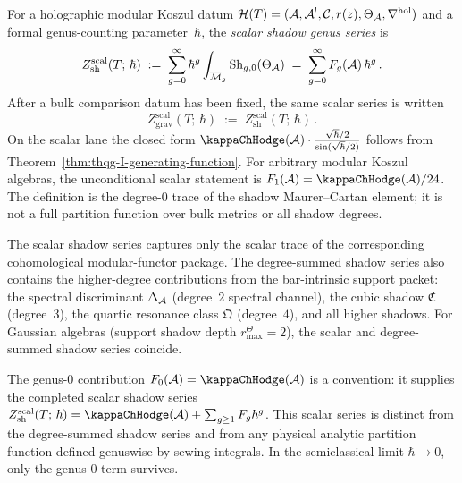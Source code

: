 \begin{definition}
For a holographic modular Koszul datum
$\mathcal{H}(T) = (\mathcal{A}, \mathcal{A}^!, \mathcal{C}, r(z), \Theta_{\mathcal{A}},
\nabla^{\mathrm{hol}})$ and a formal genus-counting
parameter~$\hbar$, the \emph{scalar shadow genus series} is
\begin{equation}%
Z_{\mathrm{sh}}^{\mathrm{scal}}(T;\,\hbar)
\;:=\;
\sum_{g=0}^{\infty} \hbar^g
\int_{\overline{\mathcal{M}}_{g}}
\operatorname{Sh}_{g,0}(\Theta_\cA)
\;=\;
\sum_{g=0}^{\infty} F_g(\cA)\,\hbar^g\,.
\end{equation}
After a bulk comparison datum has been fixed, the same scalar series is
written
\begin{equation}%
Z_{\mathrm{grav}}^{\mathrm{scal}}(T;\,\hbar)
\;:=\;
Z_{\mathrm{sh}}^{\mathrm{scal}}(T;\,\hbar)\,.
\end{equation}
On the scalar lane the closed form
$\kappaChHodge(\cA) \cdot \frac{\sqrt{\hbar}/2}{\sin(\sqrt{\hbar}/2)}$
follows from Theorem~\ref{thm:thqg-I-generating-function}. For
arbitrary modular Koszul algebras, the unconditional scalar statement
is $F_1(\cA)=\kappaChHodge(\cA)/24$. The definition is the
degree-$0$ trace of the shadow Maurer--Cartan element; it is not a full
partition function over bulk metrics or all shadow degrees.
\end{definition}

\begin{remark}
The scalar shadow series captures only the scalar trace of the
corresponding cohomological modular-functor package. The degree-summed
shadow series also contains the higher-degree contributions from the
bar-intrinsic support packet: the spectral discriminant $\Delta_{\mathcal{A}}$
\textup{(}degree~$2$ spectral channel\textup{)}, the cubic shadow
$\mathfrak{C}$ \textup{(}degree~$3$\textup{)}, the quartic resonance
class $\mathfrak{Q}$ \textup{(}degree~$4$\textup{)}, and all higher
shadows. For Gaussian algebras \textup{(}support shadow depth
\(r^\Theta_{\max}=2\)\textup{)}, the scalar and degree-summed shadow series
coincide.
\end{remark}

\begin{remark}
The genus-$0$ contribution $F_0(\cA) = \kappaChHodge(\cA)$ is a convention: it
supplies the completed scalar shadow series
$Z_{\mathrm{sh}}^{\mathrm{scal}}(T;\,\hbar)
= \kappaChHodge(\cA) + \sum_{g \geq 1} F_g \hbar^g$. This scalar series
is distinct from the degree-summed shadow series and from any physical
analytic partition function defined genuswise by sewing integrals. In
the semiclassical limit $\hbar \to 0$, only the genus-$0$ term survives.
\end{remark}

